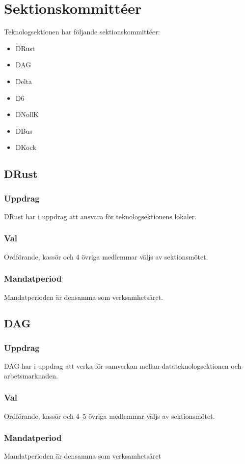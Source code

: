 \section{Sektionskommittéer}

Teknologsektionen har följande sektionskommittéer: 
\begin{itemize}
  \item DRust
  \item DAG 
  \item Delta 
  \item D6 
  \item DNollK
  \item DBus
  \item DKock
\end{itemize}

\subsection{DRust}
\subsubsection{Uppdrag}
DRust har i uppdrag att ansvara för teknologsektionens lokaler.
\subsubsection{Val}
Ordförande, kassör och 4 övriga medlemmar väljs av sektionsmötet. 
\subsubsection{Mandatperiod}
Mandatperioden är densamma som verksamhetsåret. 

\subsection{DAG}
\subsubsection{Uppdrag} 
DAG har i uppdrag att verka för samverkan mellan datateknologsektionen och arbetsmarknaden. 
\subsubsection{Val}
Ordförande, kassör och 4--5 övriga medlemmar väljs av sektionsmötet.
\subsubsection{Mandatperiod}
Mandatperioden är densamma som verksamhetsåret

